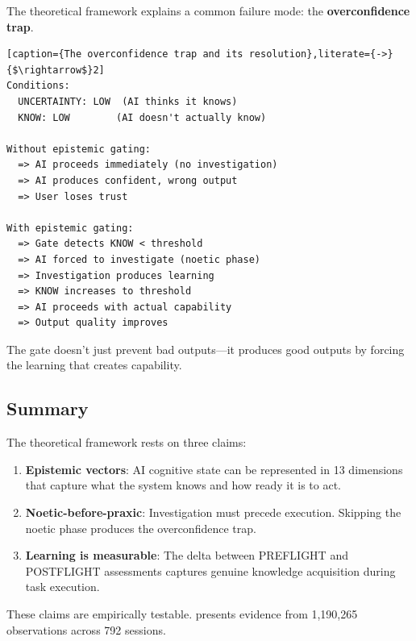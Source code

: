 The theoretical framework explains a common failure mode: the \textbf{overconfidence trap}.

\begin{lstlisting}[caption={The overconfidence trap and its resolution},literate={->}{$\rightarrow$}2]
Conditions:
  UNCERTAINTY: LOW  (AI thinks it knows)
  KNOW: LOW        (AI doesn't actually know)

Without epistemic gating:
  => AI proceeds immediately (no investigation)
  => AI produces confident, wrong output
  => User loses trust

With epistemic gating:
  => Gate detects KNOW < threshold
  => AI forced to investigate (noetic phase)
  => Investigation produces learning
  => KNOW increases to threshold
  => AI proceeds with actual capability
  => Output quality improves
\end{lstlisting}

The gate doesn't just prevent bad outputs---it produces good outputs by forcing the learning that creates capability.

\subsection{Summary}

The theoretical framework rests on three claims:

\begin{enumerate}
    \item \textbf{Epistemic vectors}: AI cognitive state can be represented in 13 dimensions that capture what the system knows and how ready it is to act.

    \item \textbf{Noetic-before-praxic}: Investigation must precede execution. Skipping the noetic phase produces the overconfidence trap.

    \item \textbf{Learning is measurable}: The delta between PREFLIGHT and POSTFLIGHT assessments captures genuine knowledge acquisition during task execution.
\end{enumerate}

These claims are empirically testable.  presents evidence from 1,190,265 observations across 792 sessions.

